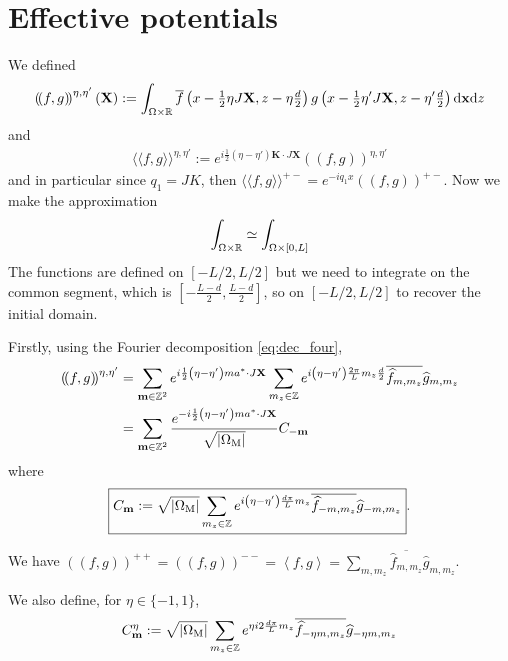 \documentclass[11pt,a4paper,reqno,french,tikz]{amsart}
\def\d{{\rm d}}
\newcommand{\pa}[1]{\left( #1 \right)} %
\newcommand{\seg}[1]{\left[ #1 \right]} %
\newcommand{\ab}[1]{\left|#1\right|} %
\newcommand{\ps}[1]{\left< #1 \right>} %
\newcommand{\f}[2]{\frac{#1}{#2}} %
\newcommand{\ind}[1]{_{\textup{#1}}} %
\newcommand{\db}[1]{\left(\!\left( #1 \right)\!\right)}
\def\bX{{\mathbf X}}
\def\bx{{\mathbf x}}
\def\bmm{{\mathbf m}}
\def\bK{{\mathbf K}}
\newcommand{\dd}{\tfrac{d}{2}}
\newcommand{\sqom}{\sqrt{\ab{\Omega\ind{M}}}}
\def\lAngle{\langle\!\langle}
\def\rAngle{\rangle\!\rangle}
\begin{document}
\section{Effective potentials}%
\label{sec:effective_potentials}

We defined
\begin{align*}
\db{ f, g}^{\eta,\eta'}(\bX) :=   \int_{\Omega \times \R} \overline{f}\pa{x - \tfrac 12 \eta J\bX,z- \eta\dd} g\pa{x - \tfrac 12 \eta' J \bX, z- \eta'\dd} \d \bx \d z
\end{align*}
and
\begin{align*}
\boxed{\lAngle f, g \rAngle^{\eta,\eta'} := e^{i\f 12 \pa{\eta-\eta'} \bK \cdot J \bX}\db{ f, g}^{\eta,\eta'}}
\end{align*}
and in particular since $q_1 = J K$, then $\lAngle f, g \rAngle^{+-} = e^{-iq_1 x}\db{ f, g}^{+-}$. Now we make the approximation
\begin{align*}
\int_{\Omega\times\R} \simeq  \int_{\Omega\times \seg{0,L}}
\end{align*}
The functions are defined on $[-L/2,L/2]$ but we need to integrate on the common segment, which is $[-\f{L-d}{2},\f{L-d}{2}]$, so on $[-L/2,L/2]$ to recover the initial domain.




Firstly, using the Fourier decomposition \eqref{eq:dec_four},
\begin{align*}
	\db{f,g}^{\eta,\eta'} &=   \sum_{\bmm \in \Z^2} e^{i\f 12 \pa{\eta-\eta'} ma^* \cdot J \bX} \sum_{m_z \in \Z} e^{i\pa{\eta-\eta'} \f{2\pi}{L} m_z \f{d}{2}} \overline{\widehat{f}_{m,m_z}} \widehat{g}_{m,m_z}\\
& = \sum_{\bmm \in \Z^2} \f{e^{-i\f 12 \pa{\eta-\eta'} ma^* \cdot J \bX}}{\sqom} C_{-\bmm}
\end{align*}
where
\begin{align*}
\boxed{C_\bmm := \sqom \sum_{m_z \in \Z} e^{i\pa{\eta-\eta'} \f{d\pi}{L} m_z} \overline{\widehat{f}_{-m,m_z}} \widehat{g}_{-m,m_z}}.
\end{align*}

We have $\db{f,g}^{++} = \db{f,g}^{--} = \ps{f,g} = \sum_{m,m_z} \overline{\widehat{f}_{m,m_z}} \widehat{g}_{m,m_z}$.

 We also define, for $\eta \in \{-1,1\}$,
\begin{align*}
C^\eta_\bmm := \sqom\sum_{m_z \in \Z} e^{\eta i2 \f{d\pi}{L} m_z} \overline{\widehat{f}_{-\eta m,m_z}} \widehat{g}_{-\eta m,m_z}
\end{align*}
\end{document}
